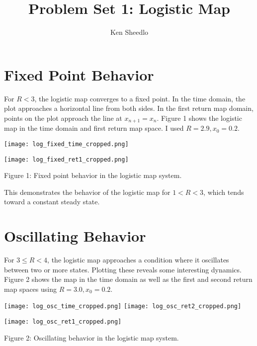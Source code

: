 \documentclass[12pt, letterpaper]{article}
\title{Problem Set 1: Logistic Map}
\author{Ken Sheedlo}
\begin{document}
\maketitle{}

\section*{Fixed Point Behavior}

For $R < 3$, the logistic map converges to a fixed point. In the time domain,
the plot approaches a horizontal line from both sides. In the first return map
domain, points on the plot approach the line at $x_{n+1} = x_n$. Figure 1 shows
the logistic map in the time domain and first return map space. I used $R = 2.9, 
x_0 = 0.2$. 

\begin{minipage}[t]{0.5\textwidth}
\begin{center}
\texttt{[image: log\_fixed\_time\_cropped.png]}
\end{center}
\end{minipage}
\begin{minipage}[t]{0.5\textwidth}
\begin{center}
\texttt{[image: log\_fixed\_ret1\_cropped.png]}
\end{center}
\end{minipage}
\begin{center}
Figure 1: Fixed point behavior in the logistic map system.
\\
\end{center}

This demonstrates the behavior of the logistic map for $1 < R < 3$, which tends
toward a constant steady state.

\section*{Oscillating Behavior}

For $3 \leq R < 4$, the logistic map approaches a condition where it oscillates 
between two or more states. Plotting these reveals some interesting dynamics. 
Figure 2 shows the map in the time domain as well as the first and second return
map spaces using $R = 3.0, x_0 = 0.2$.

\begin{minipage}[t]{0.5\textwidth}
\begin{center}
\texttt{[image: log\_osc\_time\_cropped.png]}
\texttt{[image: log\_osc\_ret2\_cropped.png]}
\end{center}
\end{minipage}
\begin{minipage}[t]{0.5\textwidth}
\begin{center}
\texttt{[image: log\_osc\_ret1\_cropped.png]}
\end{center}
\end{minipage}
\begin{center}
Figure 2: Oscillating behavior in the logistic map system.
\\
\end{center}
\end{document}
